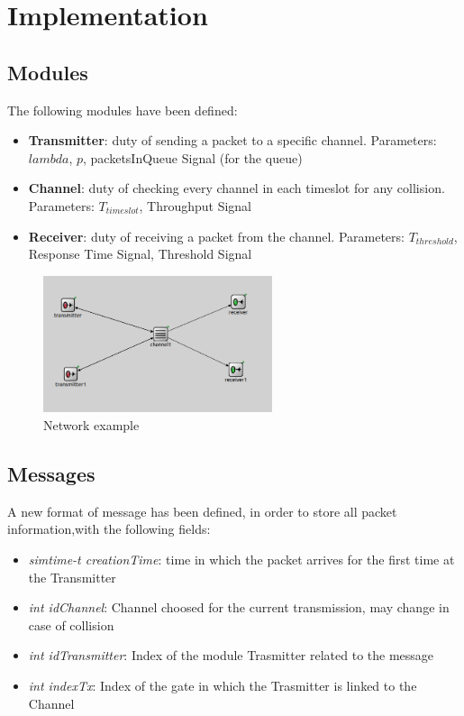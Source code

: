 \section{Implementation}
\subsection{Modules}
The following modules have been defined:
\begin{itemize}
	\item \textbf{Transmitter}: duty of sending a packet to a specific channel. Parameters: $lambda$, $p$, packetsInQueue Signal (for the queue)
	\item \textbf{Channel}: duty of checking every channel in each timeslot for any collision. Parameters: $T_{timeslot}$, Throughput Signal
	\item \textbf{Receiver}: duty of receiving a packet from the channel. Parameters: $T_{threshold}$, Response Time Signal, Threshold Signal
\end{itemize}

\begin{figure}[H]
	\centering
	\includegraphics[width=0.6\textwidth]{img/network.png}
	\caption{Network example}
	\label {img: network}
\end{figure}

\subsection{Messages}
A new format of message has been defined, in order to store all packet information,with the following fields:
\begin{itemize}
	\item \textit{simtime-t creationTime}: time in which the packet arrives for the first time at the Transmitter
	\item \textit{int idChannel}: Channel choosed for the current transmission, may change in case of collision
	\item \textit{int idTransmitter}: Index of the module Trasmitter related to the message
	\item \textit{int indexTx}: Index of the gate in which the Trasmitter is linked to the Channel
\end{itemize}

